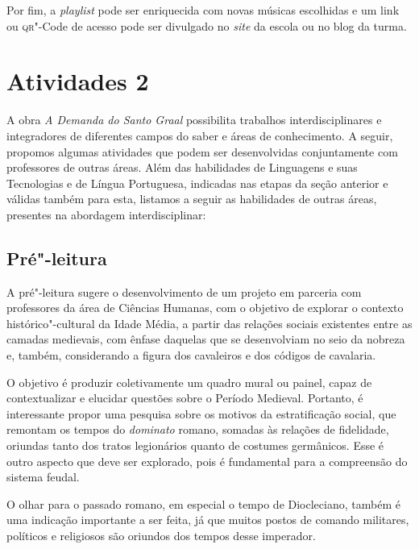 \documentclass{extarticle}
\begin{document}
Por fim, a \emph{playlist} pode ser enriquecida com novas músicas
escolhidas e um link ou \textsc{qr}"-Code de acesso pode ser divulgado no
\emph{site} da escola ou no blog da turma.


\section{Atividades 2}

A obra \emph{A Demanda do Santo Graal} possibilita trabalhos
interdisciplinares e integradores de diferentes campos do saber e áreas
de conhecimento. A seguir, propomos algumas atividades que podem ser
desenvolvidas conjuntamente com professores de outras áreas. Além das
habilidades de Linguagens e suas Tecnologias e de Língua Portuguesa,
indicadas nas etapas da seção anterior e válidas também para esta,
listamos a seguir as habilidades de outras áreas, presentes na abordagem
interdisciplinar:


\subsection{Pré"-leitura}

A pré"-leitura sugere o desenvolvimento de um projeto em
parceria com professores da área de Ciências Humanas, com o objetivo de
explorar o contexto histórico"-cultural da Idade Média, a partir das
relações sociais existentes entre as camadas medievais, com ênfase
daquelas que se desenvolviam no seio da nobreza e, também, considerando
a figura dos cavaleiros e dos códigos de cavalaria.

O objetivo é produzir coletivamente um quadro mural ou painel, capaz de
contextualizar e elucidar questões sobre o Período Medieval. Portanto, é
interessante propor uma pesquisa sobre os motivos da estratificação
social, que remontam os tempos do \emph{dominato} romano, somadas às
relações de fidelidade, oriundas tanto dos tratos legionários quanto de
costumes germânicos. Esse é outro aspecto que deve ser explorado, pois é
fundamental para a compreensão do sistema feudal.

O olhar para o passado romano, em especial o tempo de Diocleciano,
também é uma indicação importante a ser feita, já que muitos postos de
comando militares, políticos e religiosos são oriundos dos tempos desse
imperador.
\end{document}
